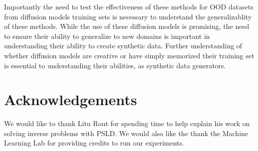 \documentclass{article}
\begin{document}
Importantly the need to test the effectiveness of these methods for OOD datasets from diffusion models training sets is necessary to understand the generalizablity 
of these methods. While the use of these diffusion models is promising, the need to ensure their ability to generalize to new domains is important in understanding their ability
to create synthetic data. Further understanding of whether diffusion models are creative or have simply memorized their training set is essential to understanding their abilities,
as synthetic data generators.

\section*{Acknowledgements}

We would like to thank Litu Rout for spending time to help explain his work on solving inverse problems with PSLD. We would also like the thank the Machine Learning Lab for
providing credits to run our experiments.



\end{document}
